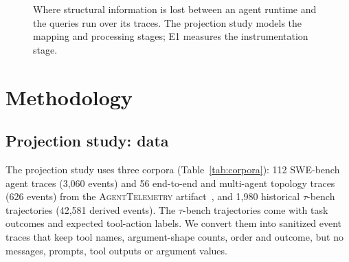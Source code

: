 \documentclass[conference]{IEEEtran}
\begin{document}
\begin{figure}[t]
\centering
{}
\caption{Where structural information is lost between an agent runtime
and the queries run over its traces. The projection study models the
mapping and processing stages; E1 measures the instrumentation stage.}
\label{fig:pipeline}
\end{figure}

\section{Methodology}
\label{sec:method}

\subsection{Projection study: data}

The projection study uses three corpora (Table~\ref{tab:corpora}): 112
SWE-bench~\cite{swebench} agent traces (3,060 events) and 56
end-to-end and multi-agent topology traces (626 events) from the
\textsc{AgentTelemetry} artifact~\cite{agenttelemetry_artifact}, and
1,980 historical $\tau$-bench~\cite{taubench} trajectories (42,581
derived events). The $\tau$-bench trajectories come with task outcomes
and expected tool-action labels. We convert them into sanitized event
traces that keep tool names, argument-shape counts, order and outcome,
but no messages, prompts, tool outputs or argument values.
\end{document}
